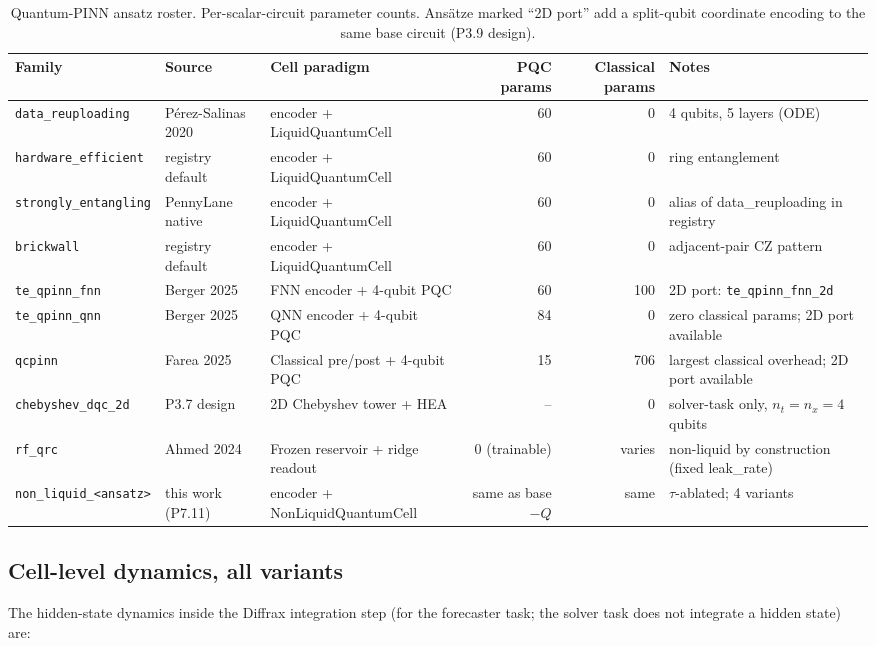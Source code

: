 \documentclass[%
  prx,
  amsmath,
  amssymb,
  aps,
  reprint,
  superscriptaddress,
  floatfix,
]{revtex4-2}
\begin{document}
\begin{table}[t]
\centering
\caption{Quantum-PINN ansatz roster. Per-scalar-circuit parameter
counts. Ansätze marked ``2D port'' add a split-qubit coordinate
encoding to the same base circuit (P3.9 design).}
\label{sup:tab:circuits}
\small
\begin{tabular}{lllrrl}
\toprule
Family & Source & Cell paradigm & PQC params & Classical params & Notes \\
\midrule
\texttt{data\_reuploading} & P\'erez-Salinas 2020 & encoder + LiquidQuantumCell &
  60 & 0 & 4 qubits, 5 layers (ODE) \\
\texttt{hardware\_efficient} & registry default & encoder + LiquidQuantumCell &
  60 & 0 & ring entanglement \\
\texttt{strongly\_entangling} & PennyLane native & encoder + LiquidQuantumCell &
  60 & 0 & alias of data\_reuploading in registry \\
\texttt{brickwall} & registry default & encoder + LiquidQuantumCell &
  60 & 0 & adjacent-pair CZ pattern \\
\texttt{te\_qpinn\_fnn} & Berger 2025 & FNN encoder + 4-qubit PQC &
  60 & 100 & 2D port: \texttt{te\_qpinn\_fnn\_2d} \\
\texttt{te\_qpinn\_qnn} & Berger 2025 & QNN encoder + 4-qubit PQC &
  84 & 0 & zero classical params; 2D port available \\
\texttt{qcpinn} & Farea 2025 & Classical pre/post + 4-qubit PQC &
  15 & 706 & largest classical overhead; 2D port available \\
\texttt{chebyshev\_dqc\_2d} & P3.7 design & 2D Chebyshev tower + HEA &
  -- & 0 & solver-task only, $n_t = n_x = 4$ qubits \\
\texttt{rf\_qrc} & Ahmed 2024 & Frozen reservoir + ridge readout &
  0 (trainable) & varies & non-liquid by construction (fixed leak\_rate) \\
\texttt{non\_liquid\_<ansatz>} & this work (P7.11) & encoder + NonLiquidQuantumCell &
  same as base $-Q$ & same & $\tau$-ablated; 4 variants \\
\bottomrule
\end{tabular}
\end{table}

\subsection{Cell-level dynamics, all variants}

The hidden-state dynamics inside the Diffrax integration step (for
the forecaster task; the solver task does not integrate a hidden
state) are:
\end{document}
